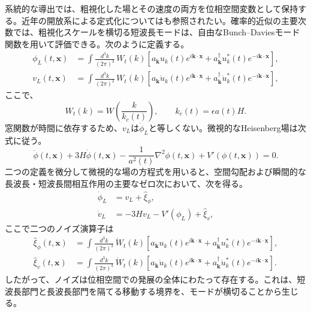 \documentclass[a4paper,11pt,oneside]{article}
\theoremstyle{definition}
\numberwithin{equation}{section}
\begin{document}
系統的な導出では、粗視化した場とその速度の両方を位相空間変数として保持する\cite{Grain:2017dqa,Vennin:2020kng}。近年の開放系による定式化については\cite{Christie:2026qsi}も参照されたい。確率的近似の主要次数では、粗視化スケールを横切る短波長モードは、自由なBunch--Daviesモード関数を用いて評価できる。次のように定義する。
\begin{align}
\phi_{L}(t,\mathbf{x})
&=
\int\frac{d^{3}k}{(2\pi)^{3}}\,
W_{t}(k)
\left[
a_{\mathbf{k}}u_{k}(t)e^{i\mathbf{k}\cdot\mathbf{x}}
+
a_{\mathbf{k}}^{\dagger}u_{k}^{*}(t)e^{-i\mathbf{k}\cdot\mathbf{x}}
\right],
\label{longfieldmovingwindow}
\\
v_{L}(t,\mathbf{x})
&=
\int\frac{d^{3}k}{(2\pi)^{3}}\,
W_{t}(k)
\left[
a_{\mathbf{k}}\dot u_{k}(t)e^{i\mathbf{k}\cdot\mathbf{x}}
+
a_{\mathbf{k}}^{\dagger}\dot u_{k}^{*}(t)e^{-i\mathbf{k}\cdot\mathbf{x}}
\right],
\end{align}
ここで、
\begin{equation}
W_{t}(k)
=
W\left(\frac{k}{k_{c}(t)}\right),
\qquad
k_{c}(t)
=
\epsilon a(t)H.
\end{equation}
窓関数が時間に依存するため、\(v_{L}\)は\(\dot\phi_{L}\)と等しくない。微視的なHeisenberg場は次式に従う。
\begin{equation}
\ddot{\phi}(t,\mathbf{x})
+
3H\dot{\phi}(t,\mathbf{x})
-
\frac{1}{a^{2}(t)}
\nabla^{2}\phi(t,\mathbf{x})
+
V'\!\left(\phi(t,\mathbf{x})\right)
=
0.
\label{microscopic_field_equation}
\end{equation}
二つの定義を微分して微視的な場の方程式を用いると、空間勾配および瞬間的な長波長・短波長間相互作用の主要なゼロ次において、次を得る。
\begin{align}
\dot\phi_{L}
&=
v_{L}
+
\hat\xi_{\phi},
\label{phase_space_langevin_phi}
\\
\dot v_{L}
&=
-3Hv_{L}
-
V'(\phi_{L})
+
\hat\xi_{v},
\label{phase_space_langevin_v}
\end{align}
ここで二つのノイズ演算子は
\begin{align}
\hat\xi_{\phi}(t,\mathbf{x})
&=
\int\frac{d^{3}k}{(2\pi)^{3}}\,
\dot W_{t}(k)
\left[
a_{\mathbf{k}}u_{k}(t)e^{i\mathbf{k}\cdot\mathbf{x}}
+
a_{\mathbf{k}}^{\dagger}u_{k}^{*}(t)e^{-i\mathbf{k}\cdot\mathbf{x}}
\right],
\label{noiseoperator}
\\
\hat\xi_{v}(t,\mathbf{x})
&=
\int\frac{d^{3}k}{(2\pi)^{3}}\,
\dot W_{t}(k)
\left[
a_{\mathbf{k}}\dot u_{k}(t)e^{i\mathbf{k}\cdot\mathbf{x}}
+
a_{\mathbf{k}}^{\dagger}\dot u_{k}^{*}(t)e^{-i\mathbf{k}\cdot\mathbf{x}}
\right].
\label{velocitynoiseoperator}
\end{align}
したがって、ノイズは位相空間での発展の全体にわたって存在する。これは、短波長部門と長波長部門を隔てる移動する境界を、モードが横切ることから生じる。
\end{document}
